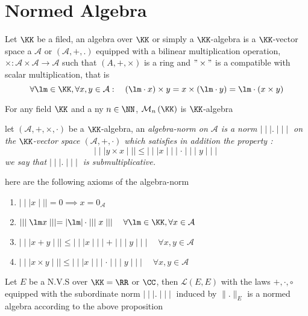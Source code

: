 % 
% 

\lecday[2025-02-18]

% 

\section{Normed Algebra}
\begin{definition}[]

Let $\KK$ be a filed, an algebra over $\KK$ or 
simply a $\KK$-algebra is a $\KK$-vector space a 
$\mathcal{A}$ or $\left( \mathcal{A} ,+,. \right)$  equipped
with a bilinear multiplication operation, 
$ \times   : \mathcal{A}  \times \mathcal{A}   \longrightarrow \mathcal{A}  $
such that 
$\left( A, + , \times   \right)$ is a ring and 
$"\times  "$ is a compatible with scalar multiplication, that 
is 
\[
\forall \lm \in  \KK, 
\forall x,y \in \mathcal{A} : 
\quad 
\left( \lm \cdot x \right) \times y  = 
x \times  \left( \lm \cdot y \right)  = 
\lm \cdot  \left(  x \times y  \right)
\]
\end{definition}
\begin{example}
	For any field $\KK$ and a ny 
	$ n \in \NN $, $\mathcal{M} _{n}\left( \KK \right)$  is 
	$\KK$-algebra
\end{example}
\begin{definition}[]
let $\left( \mathcal{A} , + , \times , \cdot   \right)$ be a 
$\KK$-algebra, an \it algebra-norm \normalfont on $\mathcal{A} $ 
is a norm $\mid \mid \mid  . \mid \mid \mid $ on the 
$\KK$-vector space $\left( \mathcal{A} , + , \cdot  \right)$  
which satisfies in addition the property : 
\[
\mid \mid \mid  y\times x  \mid \mid \mid  
\leq \mid \mid \mid  x \mid \mid \mid  \cdot 
\mid \mid \mid  y \mid \mid \mid 
\]
we say that $\mid \mid \mid   . \mid \mid \mid $  is submultiplicative.
\end{definition}
here are the following axioms of the algebra-norm 
\begin{enumerate}
\item $\mid \mid \mid  x \mid \mid \mid = 0 \implies x = 0_{\mathcal{A} }$  
\item $\mid \mid \mid  \lm x \mid \mid \mid = \left| \lm \right| 
	\cdot \mid \mid \mid  x \mid \mid \mid  \quad 
	\forall  \lm \in \KK, \forall x \in \mathcal{A} $   
\item $\mid \mid \mid  x+y \mid \mid \mid  \leq  \mid \mid \mid  x \mid \mid \mid 
		+ \mid \mid \mid  y \mid \mid \mid \quad 
		\forall  x,y \in \mathcal{A} $  
\item $\mid \mid \mid  x \times y  \mid \mid \mid  \leq 
	\mid \mid \mid  x \mid \mid \mid  \cdot  \mid \mid \mid  y \mid \mid \mid 
	\quad 
	\forall x,y \in  \mathcal{A} $  
\end{enumerate}
\begin{example}
Let $E$ be a N.V.S over $\KK = \RR $ or $\CC $, then 
$\mathcal{L} \left( E,E \right)$ with the laws $+,\cdot ,\circ $  
equipped with the subordinate norm 
$\mid \mid \mid  . \mid \mid \mid $  induced by 
$\| . \| _{E}$ is a normed algebra according to the above proposition
\end{example}
\newpage

